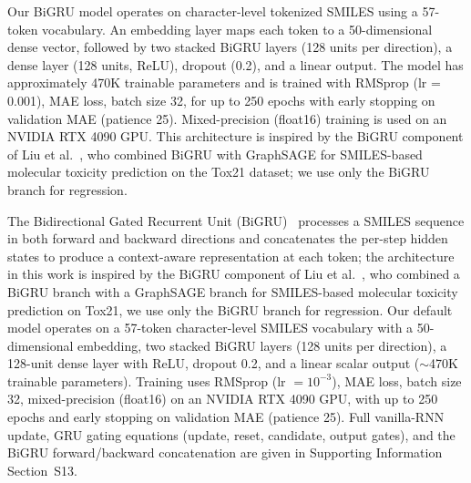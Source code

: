 \documentclass[journal=jcisd8,manuscript=article]{achemso}
\newcommand{\added}[1]{{\color{addedblue}#1}}
\begin{document}
{Our BiGRU model operates on character-level tokenized SMILES using a 57-token vocabulary.
An embedding layer maps each token to a 50-dimensional dense vector, followed by two stacked BiGRU layers (128 units per direction), a dense layer (128 units, ReLU), dropout (0.2), and a linear output.
The model has approximately 470K trainable parameters and is trained with RMSprop (lr = 0.001), MAE loss, batch size 32, for up to 250 epochs with early stopping on validation MAE (patience 25).
Mixed-precision (float16) training is used on an NVIDIA RTX 4090 GPU.
This architecture is inspired by the BiGRU component of Liu et al.~\cite{liuPredictionMolecularToxicity2023}, who combined BiGRU with GraphSAGE for SMILES-based molecular toxicity prediction on the Tox21 dataset; we use only the BiGRU branch for regression.}

\added{The Bidirectional Gated Recurrent Unit (BiGRU)~\cite{schuster1997bidirectional,cho2014learning} processes a SMILES sequence in both forward and backward directions and concatenates the per-step hidden states to produce a context-aware representation at each token; the architecture in this work is inspired by the BiGRU component of Liu et al.~\cite{liuPredictionMolecularToxicity2023}, who combined a BiGRU branch with a GraphSAGE branch for SMILES-based molecular toxicity prediction on Tox21, we use only the BiGRU branch for regression. Our default model operates on a 57-token character-level SMILES vocabulary with a 50-dimensional embedding, two stacked BiGRU layers (128 units per direction), a 128-unit dense layer with ReLU, dropout 0.2, and a linear scalar output ($\sim$470K trainable parameters). Training uses RMSprop (lr $= 10^{-3}$), MAE loss, batch size 32, mixed-precision (float16) on an NVIDIA RTX 4090 GPU, with up to 250 epochs and early stopping on validation MAE (patience 25). Full vanilla-RNN update, GRU gating equations (update, reset, candidate, output gates), and the BiGRU forward/backward concatenation are given in Supporting Information Section~S13.}
\end{document}

